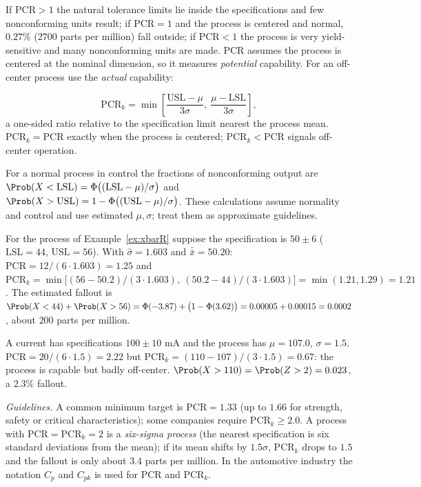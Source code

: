 If $\mathrm{PCR}>1$ the natural tolerance limits lie inside the specifications and few nonconforming units result; if $\mathrm{PCR}=1$ and the process is centered and normal, $0.27\%$ (2700 parts per million) fall outside; if $\mathrm{PCR}<1$ the process is very yield-sensitive and many nonconforming units are made. PCR assumes the process is centered at the nominal dimension, so it measures \emph{potential} capability. For an off-center process use the \emph{actual} capability:

\begin{definition}[PCR$_k$]
\[ \mathrm{PCR}_k=\min\left[\frac{\mathrm{USL}-\mu}{3\sigma},\ \frac{\mu-\mathrm{LSL}}{3\sigma}\right], \]
a one-sided ratio relative to the specification limit nearest the process mean. $\mathrm{PCR}_k=\mathrm{PCR}$ exactly when the process is centered; $\mathrm{PCR}_k<\mathrm{PCR}$ signals off-center operation.
\end{definition}

For a normal process in control the fractions of nonconforming output are $\Prob(X<\mathrm{LSL})=\Phi\big((\mathrm{LSL}-\mu)/\sigma\big)$ and $\Prob(X>\mathrm{USL})=1-\Phi\big((\mathrm{USL}-\mu)/\sigma\big)$. These calculations assume normality and control and use estimated $\mu,\sigma$; treat them as approximate guidelines.

\begin{example}
For the process of Example~\ref{ex:xbarR} suppose the specification is $50\pm6$ ($\mathrm{LSL}=44$, $\mathrm{USL}=56$). With $\hat\sigma=1.603$ and $\bar{\bar{x}}=50.20$: $\mathrm{PCR}=12/(6\cdot1.603)=1.25$ and $\mathrm{PCR}_k=\min\big[(56-50.2)/(3\cdot1.603),\ (50.2-44)/(3\cdot1.603)\big]=\min(1.21,1.29)=1.21$. The estimated fallout is $\Prob(X<44)+\Prob(X>56)=\Phi(-3.87)+\big(1-\Phi(3.62)\big)=0.00005+0.00015=0.0002$, about $200$ parts per million.
\end{example}

\begin{example}
A current has specifications $100\pm10$ mA and the process has $\mu=107.0$, $\sigma=1.5$. $\mathrm{PCR}=20/(6\cdot1.5)=2.22$ but $\mathrm{PCR}_k=(110-107)/(3\cdot1.5)=0.67$: the process is capable but badly off-center. $\Prob(X>110)=\Prob(Z>2)=0.023$, a $2.3\%$ fallout.
\end{example}

\emph{Guidelines.} A common minimum target is $\mathrm{PCR}=1.33$ (up to $1.66$ for strength, safety or critical characteristics); some companies require $\mathrm{PCR}_k\ge2.0$. A process with $\mathrm{PCR}=\mathrm{PCR}_k=2$ is a \emph{six-sigma process} (the nearest specification is six standard deviations from the mean); if its mean shifts by $1.5\sigma$, $\mathrm{PCR}_k$ drops to $1.5$ and the fallout is only about $3.4$ parts per million. In the automotive industry the notation $C_p$ and $C_{pk}$ is used for PCR and PCR$_k$.

